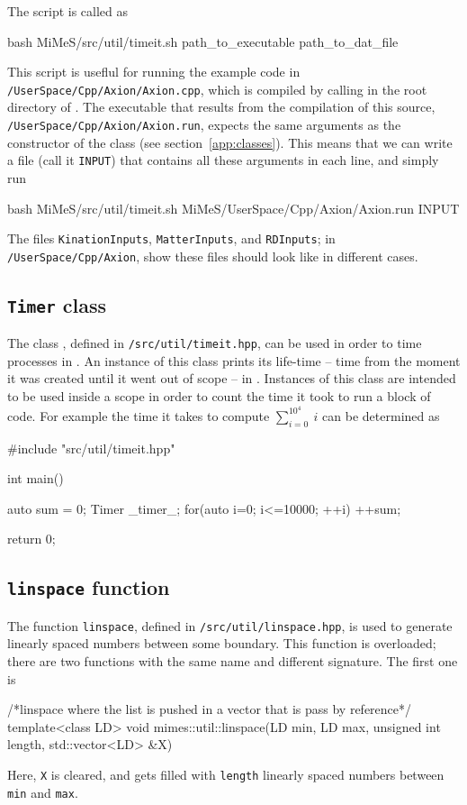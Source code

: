 \documentclass[11pt,a4paper]{article}
\begin{document}
The script is called as 
%
\begin{cpp}
	bash MiMeS/src/util/timeit.sh path_to_executable path_to_dat_file
\end{cpp}
%
This script is useflul for running the example code in {\tt \mimes/UserSpace/Cpp/Axion/Axion.cpp}, which is compiled by calling  in the root directory of \mimes. The executable that results from the compilation of this source, {\tt \mimes/UserSpace/Cpp/Axion/Axion.run}, expects the same arguments as the constructor of the  class (see section~\ref{app:classes}). This means that we can write a file (call it {\tt INPUT}) that contains all these arguments in each line, and simply run  
%
\begin{cpp}
	bash MiMeS/src/util/timeit.sh MiMeS/UserSpace/Cpp/Axion/Axion.run INPUT
\end{cpp}
%
The files {\tt KinationInputs}, {\tt MatterInputs}, and {\tt RDInputs}; in {\tt \mimes/UserSpace/Cpp/Axion}, show these files should look like in different cases.


\subsection{{\tt Timer} \CPP class}
%
The class , defined in {\tt \mimes/src/util/timeit.hpp}, can be used in order to time processes in \CPP. An instance of this class prints  its life-time -- \ie time from the moment it was created until it went out of scope -- in . Instances of this class are intended to be used inside a scope in order to count the time it took to run a block of code. For example the time it takes to compute  $\sum_{i=0}^{10^4} \ i$ can be determined as  
%
\begin{cpp}
	#include "src/util/timeit.hpp"
	
	int main(){
		auto sum = 0;
		{	
			Timer _timer_;
			for(auto i=0; i<=10000; ++i){ ++sum;}	
		}
	
		return 0;
	}
\end{cpp}

\subsection{{\tt linspace} function}
%
The function {\tt linspace}, defined in {\tt \mimes/src/util/linspace.hpp}, is used to generate linearly spaced numbers between some boundary. This function is overloaded; there are two functions with the same name and different signature. The first one is 
%
\begin{cpp}
    /*linspace where the list is pushed in a vector that is pass by reference*/	
	template<class LD>
	void mimes::util::linspace(LD min, LD max, unsigned int length, std::vector<LD> &X)
\end{cpp}
%
Here, {\tt X} is cleared, and gets filled with  {\tt length} linearly spaced numbers between {\tt min} and {\tt max}.
\end{document}
